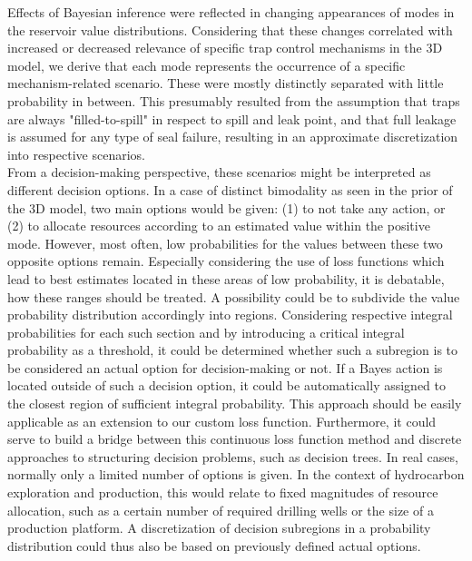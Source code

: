 	Effects of Bayesian inference were reflected in changing appearances of modes in the reservoir value distributions. Considering that these changes correlated with increased or decreased relevance of specific trap control mechanisms in the 3D model, we derive that each mode represents the occurrence of a specific mechanism-related scenario. These were mostly distinctly separated with little probability in between. This presumably resulted from the assumption that traps are always "filled-to-spill" in respect to spill and leak point, and that full leakage is assumed for any type of seal failure, resulting in an approximate discretization into respective scenarios.\\
	From a decision-making perspective, these scenarios might be interpreted as different decision options. In a case of distinct bimodality as seen in the prior of the 3D model, two main options would be given: (1) to not take any action, or (2) to allocate resources according to an estimated value within the positive mode. However, most often, low probabilities for the values between these two opposite options remain. Especially considering the use of loss functions which lead to best estimates located in these areas of low probability, it is debatable, how these ranges should be treated. A possibility could be to subdivide the value probability distribution accordingly into regions. Considering respective integral probabilities for each such section and by introducing a critical integral probability as a threshold, it could be determined whether such a subregion is to be considered an actual option for decision-making or not. If a Bayes action is located outside of such a decision option, it could be automatically assigned to the closest region of sufficient integral probability. This approach should be easily applicable as an extension to our custom loss function. Furthermore, it could serve to build a bridge between this continuous loss function method and discrete approaches to structuring decision problems, such as decision trees. In real cases, normally only a limited number of options is given. In the context of hydrocarbon exploration and production, this would relate to fixed magnitudes of resource allocation, such as a certain number of required drilling wells or the size of a production platform. A discretization of decision subregions in a probability distribution could thus also be based on previously defined actual options.\\			
